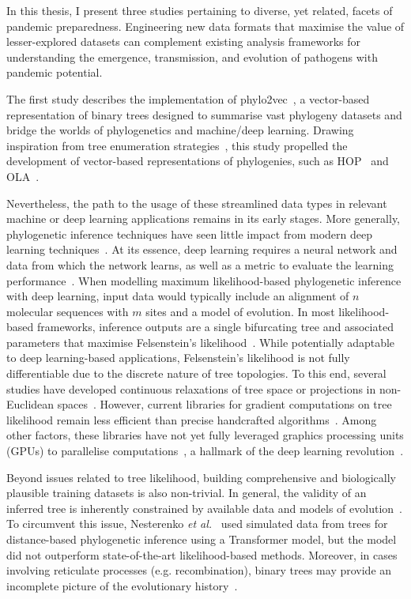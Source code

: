 In this thesis, I present three studies pertaining to diverse, yet related, facets of pandemic preparedness. Engineering new data formats that maximise the value of lesser-explored datasets can complement existing analysis frameworks for understanding the emergence, transmission, and evolution of pathogens with pandemic potential.

The first study describes the implementation of phylo2vec~\cite{penn2025}, a vector-based representation of binary trees designed to summarise vast phylogeny datasets and bridge the worlds of phylogenetics and machine/deep learning. Drawing inspiration from tree enumeration strategies~\cite{rohlf1983}, this study propelled the development of vector-based representations of phylogenies, such as HOP~\cite{chauve2025} and OLA~\cite{richman2025}.

Nevertheless, the path to the usage of these streamlined data types in relevant machine or deep learning applications remains in its early stages. More generally, phylogenetic inference techniques have seen little impact from modern deep learning techniques~\cite{sapoval2022}. At its essence, deep learning requires a neural network and data from which the network learns, as well as a metric to evaluate the learning performance~\cite{lecun2015}. When modelling maximum likelihood-based phylogenetic inference with deep learning, input data would typically include an alignment of $n$ molecular sequences with $m$ sites and a model of evolution. In most likelihood-based frameworks, inference outputs are a single bifurcating tree and associated parameters that maximise Felsenstein's likelihood~\cite{felsenstein1973, felsenstein1981}. While potentially adaptable to deep learning-based applications, Felsenstein's likelihood is not fully differentiable due to the discrete nature of tree topologies. To this end, several studies have developed continuous relaxations of tree space or projections in non-Euclidean spaces~\cite{penn2023, mimori2023, macaulay2024}. However, current libraries for gradient computations on tree likelihood remain less efficient than precise handcrafted algorithms~\cite{fourment2023}. Among other factors, these libraries have not yet fully leveraged graphics processing units (GPUs) to parallelise computations~\cite{fourment2023}, a hallmark of the deep learning revolution~\cite{krizhevsky2012, lecun2015, vaswani2017}.

Beyond issues related to tree likelihood, building comprehensive and biologically plausible training datasets is also non-trivial. In general, the validity of an inferred tree is inherently constrained by available data and models of evolution~\cite{yang2014}. To circumvent this issue, Nesterenko \textit{et al.}~\cite{nesterenko2025} used simulated data from trees for distance-based phylogenetic inference using a Transformer model, but the model did not outperform state-of-the-art likelihood-based methods. Moreover, in cases involving reticulate processes (e.g. recombination), binary trees may provide an incomplete picture of the evolutionary history~\cite{huson2006, wong2024}.

